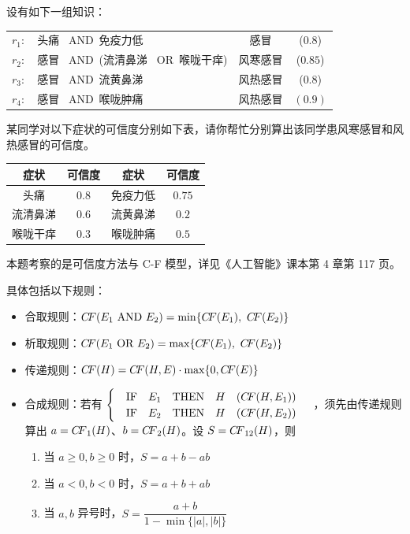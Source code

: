 \documentclass[UTF8]{ctexart}
\newcommand\AND{\  \textrm{AND}\ }
\newcommand\OR{\  \textrm{OR}\ }
\newcommand\IF{\quad\textrm{IF}\quad}
\newcommand\THEN{\quad\textrm{THEN}\quad}
\newcommand\CF{{C\hspace{-0.2em}F}}
\begin{document}
{\color{cyan!50!black}
设有如下一组知识：
\begin{table}[htb]
\color{cyan!50!black}
  \centering
  \begin{tabular}{c@{\quad IF\quad }l@{\quad THEN\quad }cc}
  $r_1:$ & 头痛 \AND 免疫力低 & 感冒 & ($0.8$) \\
  $r_2:$ & 感冒 \AND (流清鼻涕 \OR 喉咙干痒) & 风寒感冒 & ($0.85$) \\
  $r_3:$ & 感冒 \AND 流黄鼻涕 & 风热感冒 & ($0.8$) \\
  $r_4:$ & 感冒 \AND 喉咙肿痛 & 风热感冒 & $(0.9)$ \\
  \end{tabular}
\end{table}

某同学对以下症状的可信度分别如下表，请你帮忙分别算出该同学患风寒感冒和风热感冒的可信度。

\begin{table}[htb]
  \centering
  \color{cyan!50!black}
  \begin{tabular}{cccc}
  \toprule
    症状 & 可信度 & 症状 & 可信度 \\
  \midrule
    头痛 & $0.8$ & 免疫力低 & $0.75$ \\
    流清鼻涕 & $0.6$ & 流黄鼻涕 & $0.2$ \\
    喉咙干痒 & $0.3$ & 喉咙肿痛 & $0.5$ \\
  \bottomrule  
  \end{tabular}
\end{table}
}

本题考察的是可信度方法与 C-F 模型，详见《人工智能》课本第 4 章第 117 页。

具体包括以下规则：
\begin{itemize}[itemsep=0pt,parsep=0pt]
  \item 合取规则：$\CF(E_1\AND E_2) = \min\{\CF(E_1),\ \CF(E_2)\}$
  \item 析取规则：$\CF(E_1\OR E_2) = \max\{\CF(E_1),\ \CF(E_2)\}$
  \item 传递规则：$\CF(H) = \CF(H,E)\cdot \max\{0,\CF(E)\}$
  \item 合成规则：若有 $\begin{cases}
  \IF E_1 \THEN H\quad  (\CF(H,E_1))\\
  \IF E_2 \THEN H\quad  (\CF(H,E_2))
   \end{cases}$
    ，须先由传递规则算出 $a=\CF_1(H)$、$b=\CF_2(H)$。设 $S=\CF_{12}(H)$，则
      \begin{enumerate}[itemsep=2pt,parsep=0pt]
        \item 当 $a\geqslant 0,b\geqslant 0$ 时，$S = a+b-ab$
        \item 当 $a<0,b<0$ 时，$S = a+b+ab$
        \item 当 $a,b$ 异号时，$S = \dfrac{a+b}{1-\min\{|a|,|b|\}}$
      \end{enumerate}
\end{itemize}
\end{document}
